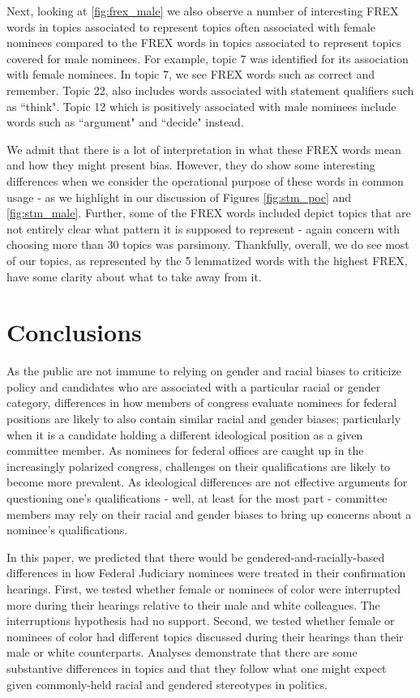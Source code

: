 \documentclass [12pt]{article}
\begin{document}
Next, looking at \ref{fig:frex_male} we also observe a number of interesting FREX words in topics associated to represent topics often associated with female nominees compared to the FREX words in topics associated to represent topics covered for male nominees. For example, topic 7 was identified for its association with female nominees. In topic 7, we see FREX words such as correct and remember. Topic 22, also includes words associated with statement qualifiers such as ``think". Topic 12 which is positively associated with male nominees include words such as ``argument" and ``decide" instead.

We admit that there is a lot of interpretation in what these FREX words mean and how they might present bias. However, they do show some interesting differences when we consider the operational purpose of these words in common usage - as we highlight in our discussion of Figures \ref{fig:stm_poc} and \ref{fig:stm_male}. Further, some of the FREX words included depict topics that are not entirely clear what pattern it is supposed to represent - again concern with choosing more than 30 topics was parsimony. Thankfully, overall, we do see most of our topics, as represented by the 5 lemmatized words with the highest FREX, have some clarity about what to take away from it.

	    
\section{Conclusions}

As the public are not immune to relying on gender and racial biases to criticize policy and candidates who are associated with a particular racial or gender category, differences in how members of congress evaluate nominees for federal positions are likely to also contain similar racial and gender biases; particularly when it is a candidate holding a different ideological position as a given committee member. As nominees for federal offices are caught up in the increasingly polarized congress, challenges on their qualifications are likely to become more prevalent. As ideological differences are not effective arguments for questioning one's qualifications - well, at least for the most part - committee members may rely on their racial and gender biases to bring up concerns about a nominee's qualifications. 

In this paper, we predicted that there would be gendered-and-racially-based differences in how Federal Judiciary nominees were treated in their confirmation hearings. First, we tested whether female or nominees of color were interrupted more during their hearings relative to their male and white colleagues. The interruptions hypothesis had no support. Second, we tested whether female or nominees of color had different topics discussed during their hearings than their male or white counterparts. Analyses demonstrate that there are some substantive differences in topics and that they follow what one might expect given commonly-held racial and gendered stereotypes in politics. 
\end{document}
